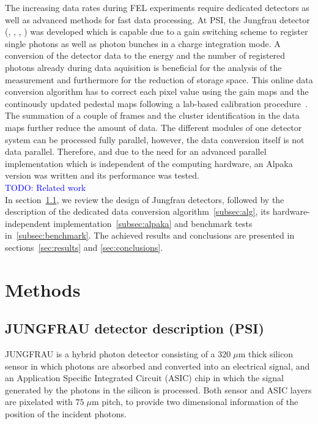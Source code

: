 \documentclass[a4paper]{article}
\begin{document}
The increasing data rates during FEL experiments require dedicated detectors as well as advanced methods for fast data processing.
At PSI, the Jungfrau detector (\cite{JFapplications}, \cite{JFcalibration}, \cite{JFoperation}, \cite{Mozzanica_2016}) was developed which is capable due to a gain switching scheme to register single photons as well as photon bunches in a charge integration mode. A conversion of the detector data to the energy and the number of registered photons already during data aquisition is beneficial for the analysis of the measurement and furthermore for the reduction of storage space. This online data conversion algorithm has to correct each pixel value using the gain maps and the continously updated pedestal maps following a lab-based calibration  procedure~\cite{JFcalibration}. The summation of a couple of frames and the cluster identification in the data maps further reduce the amount of data. The different modules of one detector system can be processed fully parallel, however, the data conversion itself is not data parallel. Therefore, and due to the need for an advanced parallel implementation which is independent of the computing hardware, an Alpaka~\cite{Matthes17} version was written and its performance was tested.\\

\textcolor{blue}{TODO: Related work}\\

In section~\ref{subsec:det}, we review the design of Jungfrau detectors, followed by the description of the dedicated data conversion algorithm~\ref{subsec:alg}, its hardware-independent implementation~\ref{subsec:alpaka} and benchmark tests in~\ref{subsec:benchmark}. The achieved results and conclusions are presented in sections~\ref{sec:results} and \ref{sec:conclusions}. 


\section{Methods}
\subsection{JUNGFRAU detector description (PSI)}
\label{subsec:det}
JUNGFRAU is a hybrid photon detector consisting of a $320\;\mu\mathrm{m}$ thick silicon sensor in which photons are absorbed and converted into an electrical signal, and an Application Specific Integrated Circuit (ASIC) chip in which the signal generated by the photons in the silicon is processed. Both sensor and ASIC layers are pixelated with $75\;\mu\mathrm{m}$ pitch, to provide two dimensional information of the position of the incident photons.
\end{document}
